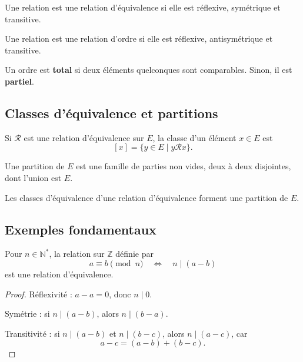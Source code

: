 \documentclass[11pt,a4paper]{article}
\newcommand{\Ns}{\mathbb{N}^*}
\newcommand{\Z}{\mathbb{Z}}
\newcommand{\ssi}{\Longleftrightarrow}
\begin{document}
\begin{definitionbox}
Une relation est une relation d'équivalence si elle est réflexive, symétrique et transitive.
\end{definitionbox}

\begin{definitionbox}
Une relation est une relation d'ordre si elle est réflexive, antisymétrique et transitive.
\end{definitionbox}

\begin{definitionbox}
Un ordre est \textbf{total} si deux éléments quelconques sont comparables. Sinon, il est \textbf{partiel}.
\end{definitionbox}

\subsection{Classes d'équivalence et partitions}

\begin{definitionbox}
Si \(\mathcal R\) est une relation d'équivalence sur \(E\), la classe d'un élément \(x\in E\) est
\[
[x]=\{y\in E\mid y\mathcal R x\}.
\]
\end{definitionbox}

\begin{definitionbox}[partition]
Une partition de \(E\) est une famille de parties non vides, deux à deux disjointes, dont l'union est \(E\).
\end{definitionbox}

\begin{theorembox}
Les classes d'équivalence d'une relation d'équivalence forment une partition de \(E\).
\end{theorembox}

\subsection{Exemples fondamentaux}

\begin{propositionbox}
Pour \(n\in\Ns\), la relation sur \(\Z\) définie par
\[
a\equiv b \pmod n \quad\ssi\quad n\mid(a-b)
\]
est une relation d'équivalence.
\end{propositionbox}

\begin{proof}
Réflexivité : \(a-a=0\), donc \(n\mid0\).

Symétrie : si \(n\mid(a-b)\), alors \(n\mid(b-a)\).

Transitivité : si \(n\mid(a-b)\) et \(n\mid(b-c)\), alors \(n\mid(a-c)\), car
\[
a-c=(a-b)+(b-c).
\]
\end{proof}
\end{document}
